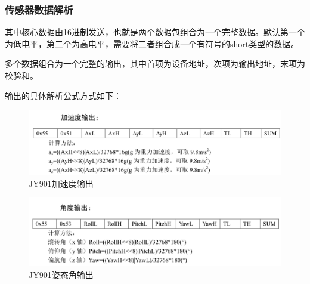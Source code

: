 \documentclass[UTF8]{article}
\begin{document}
\subsubsection{传感器数据解析}
其中核心数据由16进制发送，也就是两个数据包组合为一个完整数据。默认第一个为低电平，第二个为高电平，需要将二者组合成一个有符号的short类型的数据。\par
多个数据组合为一个完整的输出，其中首项为设备地址，次项为输出地址，末项为校验和。\par
输出的具体解析公式方式如下：
	\begin{figure}[H]
		\centering
		\includegraphics[width=\linewidth]{2-2.png}
			\caption{JY901加速度输出}	
	\end{figure}
	\begin{figure}[H]
		\centering
		\includegraphics[width=\linewidth]{2-3.png}
			\caption{JY901姿态角输出}	
	\end{figure}
\end{document}
